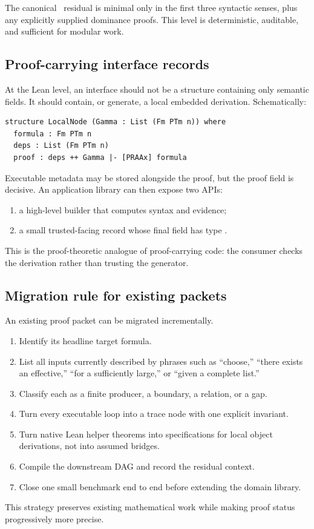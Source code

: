 The canonical \CIFER\ residual is minimal only in the first three syntactic senses, plus any explicitly supplied dominance proofs.  This level is deterministic, auditable, and sufficient for modular work.

\subsection{Proof-carrying interface records}

At the Lean level, an interface should not be a structure containing only semantic fields.  It should contain, or generate, a local embedded derivation.  Schematically:

\begin{lstlisting}
structure LocalNode (Gamma : List (Fm PTm n)) where
  formula : Fm PTm n
  deps : List (Fm PTm n)
  proof : deps ++ Gamma |- [PRAAx] formula
\end{lstlisting}

Executable metadata may be stored alongside the proof, but the proof field is decisive.  An application library can then expose two APIs:
\begin{enumerate}
\item a high-level builder that computes syntax and evidence;
\item a small trusted-facing record whose final field has type .
\end{enumerate}

This is the proof-theoretic analogue of proof-carrying code: the consumer checks the derivation rather than trusting the generator.

\subsection{Migration rule for existing packets}

An existing proof packet can be migrated incrementally.

\begin{enumerate}
\item Identify its headline target formula.
\item List all inputs currently described by phrases such as ``choose,'' ``there exists an effective,'' ``for a sufficiently large,'' or ``given a complete list.''
\item Classify each as a finite producer, a boundary, a relation, or a gap.
\item Turn every executable loop into a trace node with one explicit invariant.
\item Turn native Lean helper theorems into specifications for local object derivations, not into assumed bridges.
\item Compile the downstream DAG and record the residual context.
\item Close one small benchmark end to end before extending the domain library.
\end{enumerate}

This strategy preserves existing mathematical work while making proof status progressively more precise.

